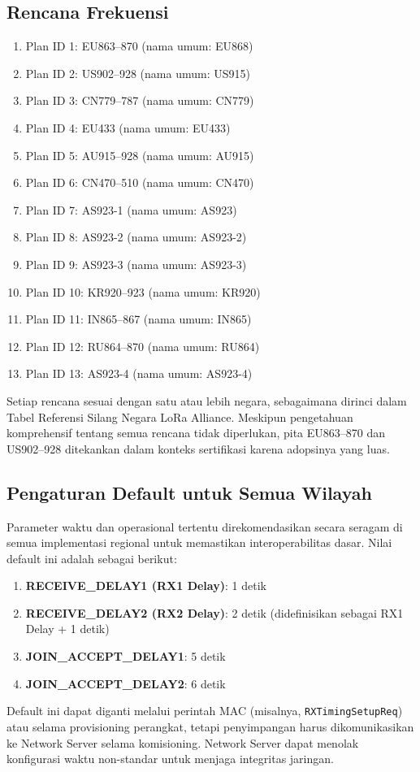 \subsection{Rencana Frekuensi}
\begin{enumerate}
    \item Plan ID 1: EU863–870 (nama umum: EU868)
    \item Plan ID 2: US902–928 (nama umum: US915)
    \item Plan ID 3: CN779–787 (nama umum: CN779)
    \item Plan ID 4: EU433 (nama umum: EU433)
    \item Plan ID 5: AU915–928 (nama umum: AU915)
    \item Plan ID 6: CN470–510 (nama umum: CN470)
    \item Plan ID 7: AS923-1 (nama umum: AS923)
    \item Plan ID 8: AS923-2 (nama umum: AS923-2)
    \item Plan ID 9: AS923-3 (nama umum: AS923-3)
    \item Plan ID 10: KR920–923 (nama umum: KR920)
    \item Plan ID 11: IN865–867 (nama umum: IN865)
    \item Plan ID 12: RU864–870 (nama umum: RU864)
    \item Plan ID 13: AS923-4 (nama umum: AS923-4)
\end{enumerate}
Setiap rencana sesuai dengan satu atau lebih negara, sebagaimana dirinci dalam Tabel Referensi Silang Negara LoRa Alliance. Meskipun pengetahuan komprehensif tentang semua rencana tidak diperlukan, pita EU863–870 dan US902–928 ditekankan dalam konteks sertifikasi karena adopsinya yang luas.
\subsection{Pengaturan Default untuk Semua Wilayah}
Parameter waktu dan operasional tertentu direkomendasikan secara seragam di semua implementasi regional untuk memastikan interoperabilitas dasar. Nilai default ini adalah sebagai berikut:
\begin{enumerate}
    \item \textbf{RECEIVE\_DELAY1 (RX1 Delay)}: 1 detik
    \item \textbf{RECEIVE\_DELAY2 (RX2 Delay)}: 2 detik (didefinisikan sebagai RX1 Delay + 1 detik)
    \item \textbf{JOIN\_ACCEPT\_DELAY1}: 5 detik
    \item \textbf{JOIN\_ACCEPT\_DELAY2}: 6 detik
\end{enumerate}
Default ini dapat diganti melalui perintah MAC (misalnya, \texttt{RXTimingSetupReq}) atau selama provisioning perangkat, tetapi penyimpangan harus dikomunikasikan ke Network Server selama komisioning. Network Server dapat menolak konfigurasi waktu non-standar untuk menjaga integritas jaringan.
